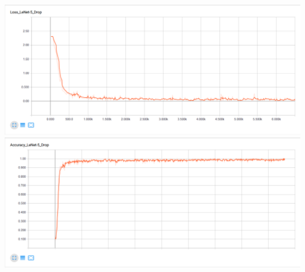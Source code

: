 \documentclass[11pt]{article}
\makeatletter
\def\maxwidth{\ifdim\Gin@nat@width>\linewidth\linewidth
    \else\Gin@nat@width\fi}
\let\Oldincludegraphics\includegraphics
\renewcommand{\includegraphics}[1]{\Oldincludegraphics[width=.8\maxwidth]{#1}}
\makeatother
\begin{document}
    \includegraphics{./MNIST_figures/LossDROP.png}
\includegraphics{./MNIST_figures/AccuracyDROP.png}


    
    
    
    
\end{document}
